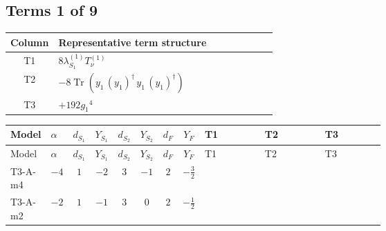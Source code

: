 \documentclass[8pt]{article}
\begin{document}
\begin{landscape}
\subsection*{Terms 1 of 9}
\begin{center}
\begin{tabular}{@{}c >{\raggedright\arraybackslash}p{0.82\linewidth}@{}}
\toprule
Column & Representative term structure \\
\midrule
T1 & \(\displaystyle 8 {\lambda_{S_1}^{(1)}} T_{\nu}^{(1)}\) \\
\midrule
T2 & \(\displaystyle -8 \operatorname{Tr}\!\left({y_1}\,\left({y_1}\right)^{\dagger}\,{y_1}\,\left({y_1}\right)^{\dagger}\right)\) \\
\midrule
T3 & \(\displaystyle +192 {g_1}^4\) \\
\midrule
\bottomrule
\end{tabular}
\end{center}
\smallskip
\tiny
\begin{longtable}{@{}llcccccc >{\raggedright\arraybackslash}p{0.21\linewidth} >{\raggedright\arraybackslash}p{0.21\linewidth} >{\raggedright\arraybackslash}p{0.21\linewidth}@{}}
\toprule
Model & $\alpha$ & $d_{S_1}$ & $Y_{S_1}$ & $d_{S_2}$ & $Y_{S_2}$ & $d_F$ & $Y_F$ & T1 & T2 & T3 \\
\midrule
\endfirsthead
\toprule
Model & $\alpha$ & $d_{S_1}$ & $Y_{S_1}$ & $d_{S_2}$ & $Y_{S_2}$ & $d_F$ & $Y_F$ & T1 & T2 & T3 \\
\midrule
\endhead
T3-A-m4 & $-4$ & $1$ & $-2$ & $3$ & $-1$ & $2$ & $-\frac{3}{2}$ & \scriptsize\adjustbox{max width=\linewidth}{$\begin{gathered} 8 {\lambda_{S_1}^{(1)}} T_{\nu}^{(1)}\end{gathered}$} & \scriptsize\adjustbox{max width=\linewidth}{$\begin{gathered} -8 \operatorname{Tr}\!\left({y_1}\,\left({y_1}\right)^{\dagger}\,{y_1}\,\left({y_1}\right)^{\dagger}\right)\end{gathered}$} & \scriptsize\adjustbox{max width=\linewidth}{$\begin{gathered} +192 {g_1}^4\end{gathered}$} \\
\midrule
T3-A-m2 & $-2$ & $1$ & $-1$ & $3$ & $0$ & $2$ & $-\frac{1}{2}$ & \scriptsize\adjustbox{max width=\linewidth}{$\begin{gathered} 8 {\lambda_{S_1}^{(1)}} T_{\nu}^{(1)}\end{gathered}$} & \scriptsize\adjustbox{max width=\linewidth}{$\begin{gathered} -8 \operatorname{Tr}\!\left({y_1}\,\left({y_1}\right)^{\dagger}\,{y_1}\,\left({y_1}\right)^{\dagger}\right)\end{gathered}$} & \scriptsize\adjustbox{max width=\linewidth}{$\begin{gathered} +12 {g_1}^4\end{gathered}$} \\

\end{longtable}
\end{landscape}
\end{document}
